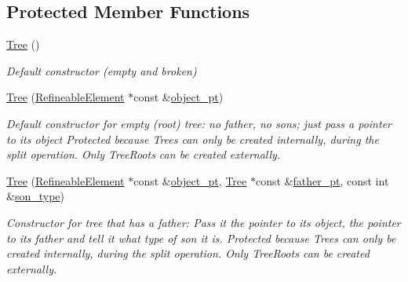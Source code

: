 \subsection*{Protected Member Functions}
\begin{DoxyCompactItemize}
\item 
\hyperlink{classoomph_1_1Tree_ada92f1aa44ee6ef5b52ec5ad0af00359}{Tree} ()
\begin{DoxyCompactList}\small\item\em Default constructor (empty and broken) \end{DoxyCompactList}\item 
\hyperlink{classoomph_1_1Tree_a6e78c3a130add917de182ab5f1674531}{Tree} (\hyperlink{classoomph_1_1RefineableElement}{Refineable\+Element} $\ast$const \&\hyperlink{classoomph_1_1Tree_a2f2eeb0f1dd161f696cccc652974ff4c}{object\+\_\+pt})
\begin{DoxyCompactList}\small\item\em Default constructor for empty (root) tree\+: no father, no sons; just pass a pointer to its object Protected because Trees can only be created internally, during the split operation. Only Tree\+Roots can be created externally. \end{DoxyCompactList}\item 
\hyperlink{classoomph_1_1Tree_a9d611dde1f429500330f28e56ee71883}{Tree} (\hyperlink{classoomph_1_1RefineableElement}{Refineable\+Element} $\ast$const \&\hyperlink{classoomph_1_1Tree_a2f2eeb0f1dd161f696cccc652974ff4c}{object\+\_\+pt}, \hyperlink{classoomph_1_1Tree}{Tree} $\ast$const \&\hyperlink{classoomph_1_1Tree_a5f8444ddeda272b70669b8bbe929708a}{father\+\_\+pt}, const int \&\hyperlink{classoomph_1_1Tree_a7537f8fe7c896d2220eb2da03567b34d}{son\+\_\+type})
\begin{DoxyCompactList}\small\item\em Constructor for tree that has a father\+: Pass it the pointer to its object, the pointer to its father and tell it what type of son it is. Protected because Trees can only be created internally, during the split operation. Only Tree\+Roots can be created externally. \end{DoxyCompactList}\end{DoxyCompactItemize}
